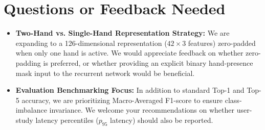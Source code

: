 \documentclass{article}
\begin{document}
\section*{Questions or Feedback Needed}
\begin{itemize}
    \item \textbf{Two-Hand vs. Single-Hand Representation Strategy:} We are expanding to a 126-dimensional representation ($42 \times 3$ features) zero-padded when only one hand is active. We would appreciate feedback on whether zero-padding is preferred, or whether providing an explicit binary hand-presence mask input to the recurrent network would be beneficial.
    \item \textbf{Evaluation Benchmarking Focus:} In addition to standard Top-1 and Top-5 accuracy, we are prioritizing Macro-Averaged F1-score to ensure class-imbalance invariance. We welcome your recommendations on whether user-study latency percentiles ($p_{95}$ latency) should also be reported.
\end{itemize}
\end{document}

